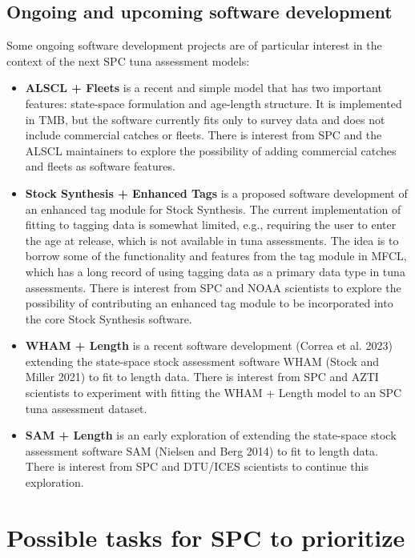 \documentclass{SCreport}
\begin{document}
\subsection{Ongoing and upcoming software development}
\label{sec:ongoing-upcoming-development}

Some ongoing software development projects are of particular interest in the
context of the next SPC tuna assessment models:

\begin{itemize}
  \item \textbf{ALSCL + Fleets} is a recent and simple model that has two
  important features: state-space formulation and age-length structure. It is
  implemented in TMB, but the software currently fits only to survey data and
  does not include commercial catches or fleets. There is interest from SPC and
  the ALSCL maintainers to explore the possibility of adding commercial catches
  and fleets as software features.
  \item \textbf{Stock Synthesis + Enhanced Tags} is a proposed software
  development of an enhanced tag module for Stock Synthesis. The current
  implementation of fitting to tagging data is somewhat limited, e.g., requiring
  the user to enter the age at release, which is not available in tuna
  assessments. The idea is to borrow some of the functionality and features from
  the tag module in MFCL, which has a long record of using tagging data as a
  primary data type in tuna assessments. There is interest from SPC and NOAA
  scientists to explore the possibility of contributing an enhanced tag module
  to be incorporated into the core Stock Synthesis software.
  \item \textbf{WHAM + Length} is a recent software development (Correa et al.
  2023) extending the state-space stock assessment software WHAM (Stock and
  Miller 2021) to fit to length data. There is interest from SPC and AZTI
  scientists to experiment with fitting the WHAM + Length model to an SPC tuna
  assessment dataset.
  \item \textbf{SAM + Length} is an early exploration of extending the
  state-space stock assessment software SAM (Nielsen and Berg 2014) to fit to
  length data. There is interest from SPC and DTU/ICES scientists to continue
  this exploration.
\end{itemize}

\section{Possible tasks for SPC to prioritize}
\label{sec:possible-tasks}
\end{document}
